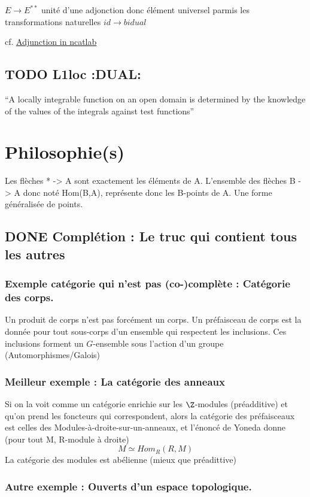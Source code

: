 \documentclass[11pt]{article}
\begin{document}
$E \to E^{**}$ unité d'une adjonction donc élément universel parmis les transformations naturelles $id \to bidual$

cf. \href{https://ncatlab.org/nlab/show/adjunction}{Adjunction in ncatlab}
\subsection{\textbf{TODO} L1loc \textbf{:DUAL:}}
\label{sec-1-6}


``A locally integrable function on an open domain is determined by the knowledge of the values of the integrals against test functions''
\section{Philosophie(s)}
\label{sec-2}


Les flèches * -> A sont exactement les éléments de A.
L'ensemble des flèches B -> A donc noté Hom(B,A), représente donc les B-points de A. Une forme généralisée de points.
\subsection{\textbf{DONE} Complétion : Le truc qui contient tous les autres}
\label{sec-2-1}
\subsubsection{Exemple catégorie qui n'est pas (co-)complète : Catégorie des corps.}
\label{sec-2-1-1}

Un produit de corps n'est pas forcément un corps.
Un préfaisceau de corps est la donnée pour tout sous-corps d'un ensemble qui respectent les inclusions.
Ces inclusions forment un $G$-ensemble sous l'action d'un groupe (Automorphismes/Galois)
\subsubsection{Meilleur exemple : La catégorie des anneaux}
\label{sec-2-1-2}

Si on la voit comme un catégorie enrichie sur les $\Z$-modules (préadditive) et qu'on prend les foncteurs qui correspondent, alors la catégorie des préfaisceaux est celles des Modules-à-droite-sur-un-anneaux, et l'énoncé de Yoneda donne (pour tout M, R-module à droite)
\[
M \simeq Hom_{R}(R,M)
\]
La catégorie des modules est abélienne (mieux que préadittive)
\subsubsection{Autre exemple : Ouverts d'un espace topologique.}
\label{sec-2-1-3}
\end{document}
